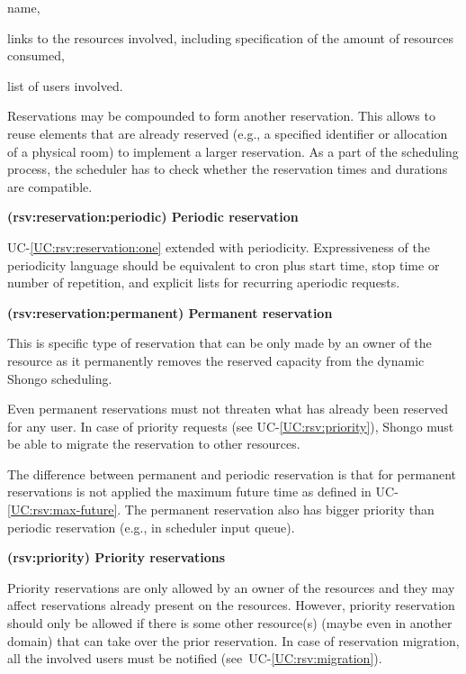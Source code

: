 \documentclass[a4paper]{report}
\makeatletter
\newcounter{UCcounter}
\newenvironment{UseCases}%
	{\begin{list}{\textbf{UC-\arabic{UCcounter}}}{\@nmbrlisttrue\def\@listctr{UCcounter}}}%
	{\end{list}}
\newcommand{\UClabel}[1]{\label{UC:#1}}
\newcommand{\UCref}[1]{UC-\ref{UC:#1}}
\newcommand{\UseCase}[2]{\item\UClabel{#2} \textbf{(#2) #1}\\ \nopagebreak}
\makeatother
\begin{document}
\begin{UseCases}
\begin{compactitem}
\item name,

\item links to the resources involved, including specification of the amount of resources consumed,

\item list of users involved.

\end{compactitem}

Reservations may be compounded to form another reservation. This allows to
reuse elements that are already reserved (e.g., a specified identifier or
allocation of a physical room) to implement a larger reservation. As a part of
the scheduling process, the scheduler has to check whether the reservation
times and durations are compatible.


\UseCase{Periodic reservation}{rsv:reservation:periodic}

\UCref{rsv:reservation:one} extended with periodicity. Expressiveness of the
periodicity language should be equivalent to cron plus start time, stop time or number of repetition, and explicit lists for recurring aperiodic requests.

\UseCase{Permanent reservation}{rsv:reservation:permanent}

This is specific type of reservation that can be only made by an owner of the
resource as it permanently removes the reserved capacity from the dynamic
Shongo scheduling.

Even permanent reservations must not threaten what has already been reserved for any user. In case of priority requests (see \UCref{rsv:priority}), Shongo must be able to migrate the reservation to other resources.

The difference between permanent and periodic reservation is that for permanent reservations is not applied the maximum future time as defined in \UCref{rsv:max-future}. The permanent reservation also has bigger priority than periodic reservation (e.g., in scheduler input queue).

\UseCase{Priority reservations}{rsv:priority}

Priority reservations are only allowed by an owner of the resources and they
may affect reservations already present on the resources. However, priority
reservation should only be allowed if there is some other resource(s) (maybe
even in another domain) that can take over the prior reservation. In case of
reservation migration, all the involved users must be notified
(see~\UCref{rsv:migration}).


\end{UseCases}
\end{document}
